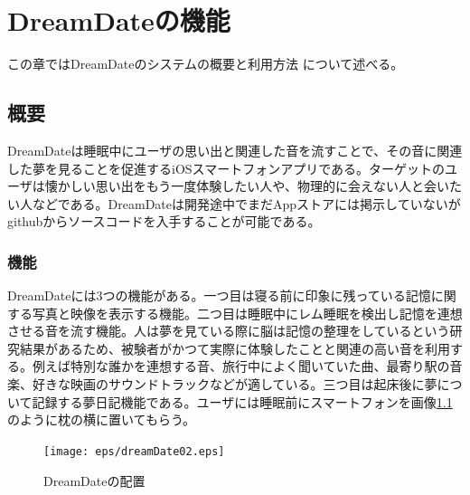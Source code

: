 \chapter{DreamDateの機能}
\label{chap:search}

この章ではDreamDateのシステムの概要と利用方法 について述べる。

\section{概要}
DreamDateは睡眠中にユーザの思い出と関連した音を流すことで、その音に関連した夢を見ることを促進するiOSスマートフォンアプリである。ターゲットのユーザは懐かしい思い出をもう一度体験したい人や、物理的に会えない人と会いたい人などである。DreamDateは開発途中でまだAppストアには掲示していないがgithubからソースコードを入手することが可能である。\\

\subsection{機能}
DreamDateには3つの機能がある。一つ目は寝る前に印象に残っている記憶に関する写真と映像を表示する機能。二つ目は睡眠中にレム睡眠を検出し記憶を連想させる音を流す機能。人は夢を見ている際に脳は記憶の整理をしているという研究結果があるため、被験者がかつて実際に体験したことと関連の高い音を利用する。例えば特別な誰かを連想する音、旅行中によく聞いていた曲、最寄り駅の音楽、好きな映画のサウンドトラックなどが適している。三つ目は起床後に夢について記録する夢日記機能である。ユーザには睡眠前にスマートフォンを画像\ref{DreamDateImage}のように枕の横に置いてもらう。\\
\begin{figure}[htbp]
\begin{center}
\texttt{[image: eps/dreamDate02.eps]}
\caption{DreamDateの配置}
\label{DreamDateImage}
\end{center}
\end{figure}

